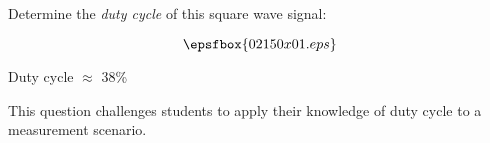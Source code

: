 

Determine the {\it duty cycle} of this square wave signal:

$$\epsfbox{02150x01.eps}$$







Duty cycle $\approx$ 38\%







This question challenges students to apply their knowledge of duty cycle to a measurement scenario.




